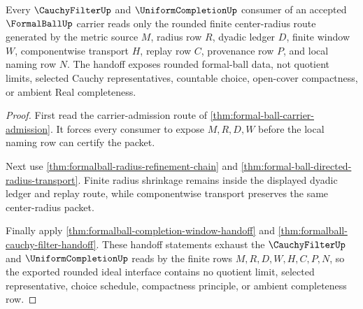 \begin{theorem}
\label{thm:formal-ball-rounded-ideal-handoff}
Every $\CauchyFilterUp$ and $\UniformCompletionUp$ consumer of an accepted $\FormalBallUp$ carrier reads only the rounded finite center-radius route generated by the metric source $M$, radius row $R$, dyadic ledger $D$, finite window $W$, componentwise transport $H$, replay row $C$, provenance row $P$, and local naming row $N$. The handoff exposes rounded formal-ball data, not quotient limits, selected Cauchy representatives, countable choice, open-cover compactness, or ambient Real completeness.
\end{theorem}
\begin{proof}
First read the carrier-admission route of \autoref{thm:formal-ball-carrier-admission}. It forces every consumer to expose $M,R,D,W$ before the local naming row can certify the packet.

Next use \autoref{thm:formalball-radius-refinement-chain} and \autoref{thm:formal-ball-directed-radius-transport}. Finite radius shrinkage remains inside the displayed dyadic ledger and replay route, while componentwise transport preserves the same center-radius packet.

Finally apply \autoref{thm:formalball-completion-window-handoff} and \autoref{thm:formalball-cauchy-filter-handoff}. These handoff statements exhaust the $\CauchyFilterUp$ and $\UniformCompletionUp$ reads by the finite rows $M,R,D,W,H,C,P,N$, so the exported rounded ideal interface contains no quotient limit, selected representative, choice schedule, compactness principle, or ambient completeness row.
\end{proof}

